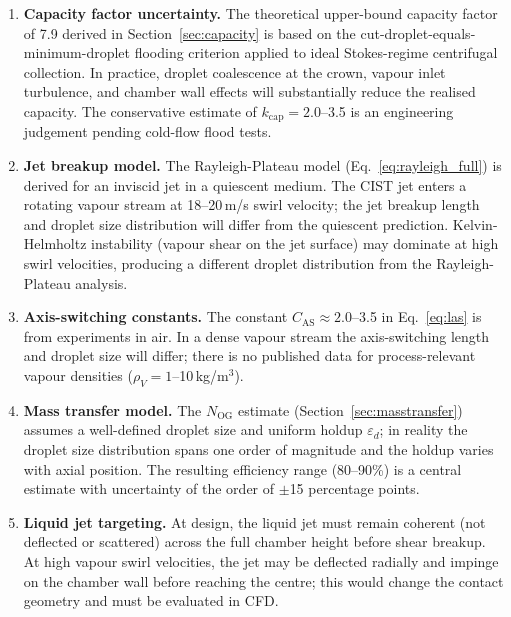 \documentclass[11pt,letterpaper]{article}
\newcommand{\rhoV}{\rho_V}
\newcommand{\Ntu}{N_{\mathrm{OG}}}
\begin{document}
\begin{enumerate}[nosep]
  \item \textbf{Capacity factor uncertainty.}
    The theoretical upper-bound capacity factor of 7.9 derived in
    Section~\ref{sec:capacity} is based on the cut-droplet-equals-minimum-droplet
    flooding criterion applied to ideal Stokes-regime centrifugal collection.
    In practice, droplet coalescence at the crown, vapour inlet turbulence, and
    chamber wall effects will substantially reduce the realised capacity.
    The conservative estimate of $k_{\mathrm{cap}} = 2.0$--3.5 is an engineering
    judgement pending cold-flow flood tests.

  \item \textbf{Jet breakup model.}
    The Rayleigh-Plateau model (Eq.~\ref{eq:rayleigh_full}) is derived for
    an inviscid jet in a quiescent medium.  The CIST jet enters a rotating
    vapour stream at 18--20\,m/s swirl velocity; the jet breakup length and
    droplet size distribution will differ from the quiescent prediction.
    Kelvin-Helmholtz instability (vapour shear on the jet surface) may
    dominate at high swirl velocities, producing a different droplet
    distribution from the Rayleigh-Plateau analysis.

  \item \textbf{Axis-switching constants.}
    The constant $C_{\mathrm{AS}} \approx 2.0$--3.5 in Eq.~\eqref{eq:las}
    is from experiments in air.  In a dense vapour stream the axis-switching
    length and droplet size will differ; there is no published data for
    process-relevant vapour densities ($\rhoV = 1$--10\,kg/m$^3$).

  \item \textbf{Mass transfer model.}
    The $\Ntu$ estimate (Section~\ref{sec:masstransfer}) assumes a
    well-defined droplet size and uniform holdup $\varepsilon_d$; in
    reality the droplet size distribution spans one order of magnitude and
    the holdup varies with axial position.  The resulting efficiency range
    (80--90\%) is a central estimate with uncertainty of the order of $\pm$15
    percentage points.

  \item \textbf{Liquid jet targeting.}
    At design, the liquid jet must remain coherent (not deflected or
    scattered) across the full chamber height before shear breakup.  At high
    vapour swirl velocities, the jet may be deflected radially and impinge on
    the chamber wall before reaching the centre; this would change the contact
    geometry and must be evaluated in CFD.


\end{enumerate}
\end{document}
